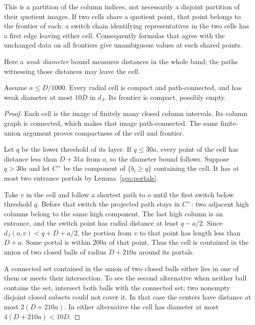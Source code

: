 This is a partition of the column indices, not necessarily a disjoint
partition of their quotient images.  If two cells share a quotient point,
that point belongs to the frontier of each: a switch chain identifying
representatives in the two cells has a first edge leaving either cell.
Consequently formulas that agree with the unchanged data on all frontiers
give unambiguous values at such shared points.

Here a \emph{weak diameter} bound measures distances in the whole band;
the paths witnessing those distances may leave the cell.

\begin{lemma}\label{geo:cells}
Assume $a\le D/1000$.  Every radial cell is compact and path-connected,
and has weak diameter at most $10D$ in $d_J$.  Its frontier is compact,
possibly empty.
\end{lemma}

\begin{proof}
Each cell is the image of finitely many closed column intervals.  Its
column graph is connected, which makes that image path-connected.  The
same finite-union argument proves compactness of the cell and frontier.

Let $q$ be the lower threshold of its layer.  If $q\le30a$, every point
of the cell has distance less than $D+31a$ from $o$, so the diameter bound
follows.  Suppose $q>30a$ and let $C^+$ be the component of $\{b_i\ge q\}$
containing the cell.  It has at most two entrance portals by
Lemma~\ref{geo:portals}.

Take $v$ in the cell and follow a shortest path to $o$ until the first
switch below threshold $q$.  Before that switch the projected path stays
in $C^+$: two adjacent high columns belong to the same high component.
The last high column is an entrance, and the switch point has radial
distance at least $q-a/2$.  Since $d_J(o,v)<q+D+a/2$, the portion from $v$
to that point has length less than $D+a$.  Some portal is within $200a$
of that point.  Thus the cell is contained in the union of two closed
balls of radius $D+210a$ around its portals.

A connected set contained in the union of two closed balls either lies
in one of them or meets their intersection.  To see the second alternative
when neither ball contains the set, intersect both balls with the connected
set; two nonempty disjoint closed subsets could not cover it.  In that
case the centers have distance at most $2(D+210a)$.  In either alternative
the cell has diameter at most $4(D+210a)<10D$.
\end{proof}

